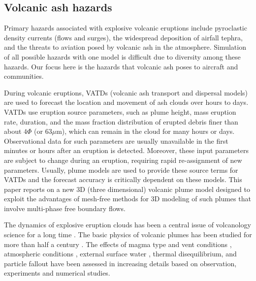\documentclass[journal abbreviation, manuscript]{copernicus}
\begin{document}
\introduction  %
\subsection{Volcanic ash hazards}
Primary hazards associated with explosive volcanic eruptions include pyroclastic density currents (flows and surges), the widespread deposition of airfall tephra, and the threats to aviation posed by volcanic ash in the atmosphere.
Simulation of all possible hazards with one model is difficult due to diversity among these hazards. Our focus here is the hazards that volcanic ash poses to aircraft and communities. 

During volcanic eruptions, VATDs (volcanic ash transport and dispersal models) are used to forecast the location and movement of ash clouds over hours to days.  VATDs use eruption source parameters, such as plume height, mass eruption rate, duration, and the mass fraction distribution of erupted debris finer than about $4 \Phi$ (or $63  \mu$m), which can remain in the cloud for many hours or days. Observational data for such parameters are usually unavailable in the first minutes or hours after an eruption is detected. Moreover, these input parameters are subject to change during an eruption, requiring rapid re-assignment of new parameters. Usually, plume models are used to provide these source terms for VATDs and the forecast accuracy is critically dependent on these models. This paper reports on a new 3D (three dimensional) volcanic plume model designed to exploit the advantages of mesh-free methods for 3D modeling of such plumes that involve multi-phase free boundary flows.

The dynamics of explosive eruption clouds has been a central issue of volcanology science for a long time \citep{settle1978volcanic, wilson1978control}.
The basic physics of volcanic plumes has been studied for more than half a century \citep{morton1956turbulent, settle1978volcanic, wilson1978control}. The effects of magma type and vent conditions \citep{woods1988fluid, woods1995decompression}, atmospheric conditions \citep{ woods1993moist, sparks1997volcanic, bursik2001effect}, external surface water \citep{koyaguchi1996formation}, thermal disequilibrium, and particle fallout \citep{woods1991particle} have been assessed in increasing details based on observation, experiments and numerical studies.
\end{document}
